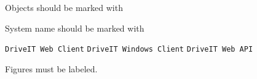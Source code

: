 
Objects should be marked with \texttt{}

System name should be marked with \texttt{}

\texttt{DriveIT Web Client}
\texttt{DriveIT Windows Client}
\texttt{DriveIT Web API}

Figures must be labeled.